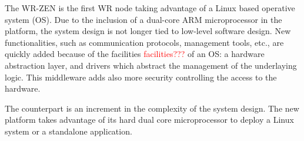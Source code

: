 %

The WR-ZEN is the first WR node taking advantage of a Linux 
based operative system (OS). Due to the inclusion of a dual-core ARM 
microprocessor in the platform, the system design is not longer tied to 
low-level software design. New functionalities, such as communication 
protocols, management tools, etc., are quickly added because of the 
facilities \textcolor{red}{facilities???} of an OS: a hardware abstraction layer, and drivers which abstract 
the management of the underlaying logic. This middleware adds also more 
security controlling the access to the hardware.

The counterpart is an increment in the complexity of the system design. The new platform takes advantage of its hard dual core microprocessor to deploy a Linux system or a standalone application.

